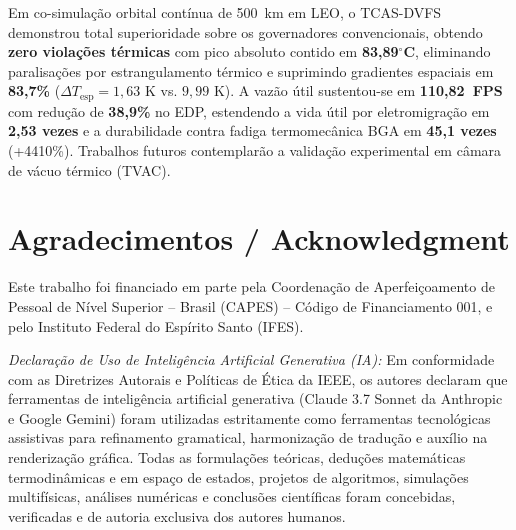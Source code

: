 \documentclass[journal]{IEEEtran}
\begin{document}
Em co-simulação orbital contínua de 500~km em LEO, o TCAS-DVFS demonstrou total superioridade sobre os governadores convencionais, obtendo \textbf{zero violações térmicas} com pico absoluto contido em \textbf{83,89$^\circ$C}, eliminando paralisações por estrangulamento térmico e suprimindo gradientes espaciais em \textbf{83,7\%} ($\Delta T_{\text{esp}} = 1{,}63\text{ K}$ vs. $9{,}99\text{ K}$). A vazão útil sustentou-se em \textbf{110,82~FPS} com redução de \textbf{38,9\%} no EDP, estendendo a vida útil por eletromigração em \textbf{2,53 vezes} e a durabilidade contra fadiga termomecânica BGA em \textbf{45,1 vezes} (+4410\%). Trabalhos futuros contemplarão a validação experimental em câmara de vácuo térmico (TVAC).

\section*{Agradecimentos / Acknowledgment}
Este trabalho foi financiado em parte pela Coordenação de Aperfeiçoamento de Pessoal de Nível Superior -- Brasil (CAPES) -- Código de Financiamento 001, e pelo Instituto Federal do Espírito Santo (IFES).

\textit{Declaração de Uso de Inteligência Artificial Generativa (IA):} Em conformidade com as Diretrizes Autorais e Políticas de Ética da IEEE, os autores declaram que ferramentas de inteligência artificial generativa (Claude 3.7 Sonnet da Anthropic e Google Gemini) foram utilizadas estritamente como ferramentas tecnológicas assistivas para refinamento gramatical, harmonização de tradução e auxílio na renderização gráfica. Todas as formulações teóricas, deduções matemáticas termodinâmicas e em espaço de estados, projetos de algoritmos, simulações multifísicas, análises numéricas e conclusões científicas foram concebidas, verificadas e de autoria exclusiva dos autores humanos.
\end{document}
